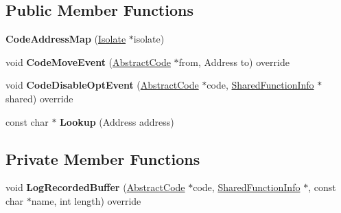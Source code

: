 \subsection*{Public Member Functions}
\begin{DoxyCompactItemize}
\item 
{\bfseries Code\+Address\+Map} (\hyperlink{classv8_1_1internal_1_1_isolate}{Isolate} $\ast$isolate)\hypertarget{classv8_1_1internal_1_1_code_address_map_ae6049c6139e77f95124fbf0d03b1738b}{}\label{classv8_1_1internal_1_1_code_address_map_ae6049c6139e77f95124fbf0d03b1738b}

\item 
void {\bfseries Code\+Move\+Event} (\hyperlink{classv8_1_1internal_1_1_abstract_code}{Abstract\+Code} $\ast$from, Address to) override\hypertarget{classv8_1_1internal_1_1_code_address_map_a93b59e8ad02b8241ddf837178342b1cb}{}\label{classv8_1_1internal_1_1_code_address_map_a93b59e8ad02b8241ddf837178342b1cb}

\item 
void {\bfseries Code\+Disable\+Opt\+Event} (\hyperlink{classv8_1_1internal_1_1_abstract_code}{Abstract\+Code} $\ast$code, \hyperlink{classv8_1_1internal_1_1_shared_function_info}{Shared\+Function\+Info} $\ast$shared) override\hypertarget{classv8_1_1internal_1_1_code_address_map_a0bef76e54f52a897e9ea6c73a87d18be}{}\label{classv8_1_1internal_1_1_code_address_map_a0bef76e54f52a897e9ea6c73a87d18be}

\item 
const char $\ast$ {\bfseries Lookup} (Address address)\hypertarget{classv8_1_1internal_1_1_code_address_map_a7390ba26a90e3c63b006d79b874d59a4}{}\label{classv8_1_1internal_1_1_code_address_map_a7390ba26a90e3c63b006d79b874d59a4}

\end{DoxyCompactItemize}
\subsection*{Private Member Functions}
\begin{DoxyCompactItemize}
\item 
void {\bfseries Log\+Recorded\+Buffer} (\hyperlink{classv8_1_1internal_1_1_abstract_code}{Abstract\+Code} $\ast$code, \hyperlink{classv8_1_1internal_1_1_shared_function_info}{Shared\+Function\+Info} $\ast$, const char $\ast$name, int length) override\hypertarget{classv8_1_1internal_1_1_code_address_map_ae4a2c80ad1912202b91a202b7b4fc559}{}\label{classv8_1_1internal_1_1_code_address_map_ae4a2c80ad1912202b91a202b7b4fc559}

\end{DoxyCompactItemize}
